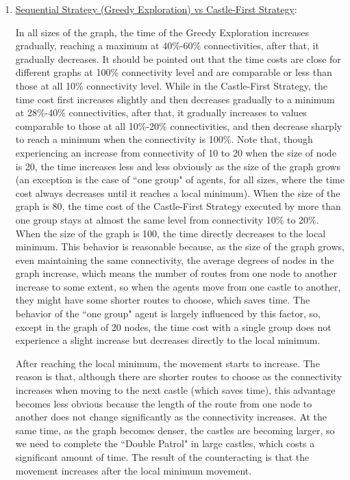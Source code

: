 \begin{enumerate}
\item \underline{Sequential Strategy ({\sc Greedy} Exploration) vs {\sc Castle-First} Strategy}: 

In all sizes of the graph, the time of the {\sc Greedy} Exploration increases gradually, reaching a maximum at 40\%-60\% connectivities, after that, it gradually decreases. It should be pointed out that the time costs are close for different graphs at 100\% connectivity level and are comparable or less than those at all 10\% connectivity level. While in the {\sc Castle-First} Strategy, the time cost first increases slightly and then decreases gradually to a minimum at 28\%-40\% connectivities, after that, it gradually increases to values comparable to those at all 10\%-20\% connectivities, and then decrease sharply to reach a minimum when the connectivity is 100\%. Note that,  though experiencing an increase from connectivity of 10 to 20 when the size of node is 20, the time increases less and less obviously as the size of the graph grows (an exception is the case of  ``one group" of agents, for  all sizes,  where  the time cost    always decreases   until it reaches a local minimum). When the size of the graph is 80, the time cost of the {\sc Castle-First} Strategy executed by more than one group stays at almost the same level from connectivity   10\% to 20\%. When the size of the graph is 100, the time directly decreases to the local minimum. This behavior is reasonable because,  as the size of the graph grows, even maintaining the same connectivity, the average degrees of nodes in the graph increase, which means the number of routes from one node to another increase to some extent, so when the agents move from one castle to another, they might have some shorter routes to choose, which saves time. The behavior of the ``one group" agent is largely influenced by this factor, so,  except in the graph of 20 nodes, the time cost with a single group does not experience a  slight increase but decreases directly to the local minimum.

After reaching the local minimum, the movement starts to increase. The reason is that, although there are shorter routes to choose as the connectivity increases when moving to the next castle (which saves time),  this advantage becomes less obvious because the length of the route from one node to another does not change significantly
 as the connectivity increases. At the same time, as the graph becomes denser, the castles are becoming larger, so we need to complete the ``Double Patrol" in large castles, which costs a significant amount of time. The result of the counteracting is that the movement increases after the local minimum movement. 


\end{enumerate}

